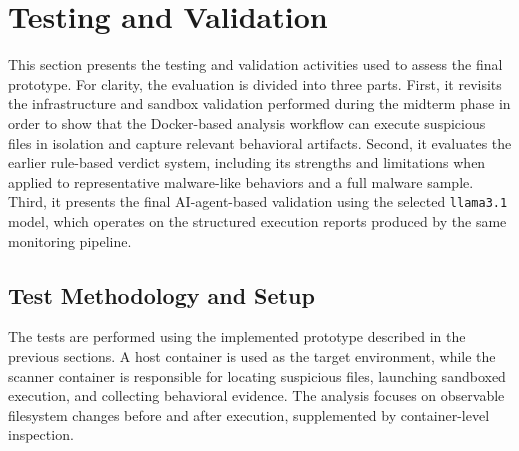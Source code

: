 \section{Testing and Validation}
\noindent
This section presents the testing and validation activities used to assess the final prototype. For clarity, the evaluation is divided into three parts. First, it revisits the infrastructure and sandbox validation performed during the midterm phase in order to show that the Docker-based analysis workflow can execute suspicious files in isolation and capture relevant behavioral artifacts. Second, it evaluates the earlier rule-based verdict system, including its strengths and limitations when applied to representative malware-like behaviors and a full malware sample. Third, it presents the final AI-agent-based validation using the selected \texttt{llama3.1} model, which operates on the structured execution reports produced by the same monitoring pipeline.

\subsection{Test Methodology and Setup}
\noindent
The tests are performed using the implemented prototype described in the previous sections. A host container is used as the target environment, while the scanner container is responsible for locating suspicious files, launching sandboxed execution, and collecting behavioral evidence. The analysis focuses on observable filesystem changes before and after execution, supplemented by container-level inspection.

